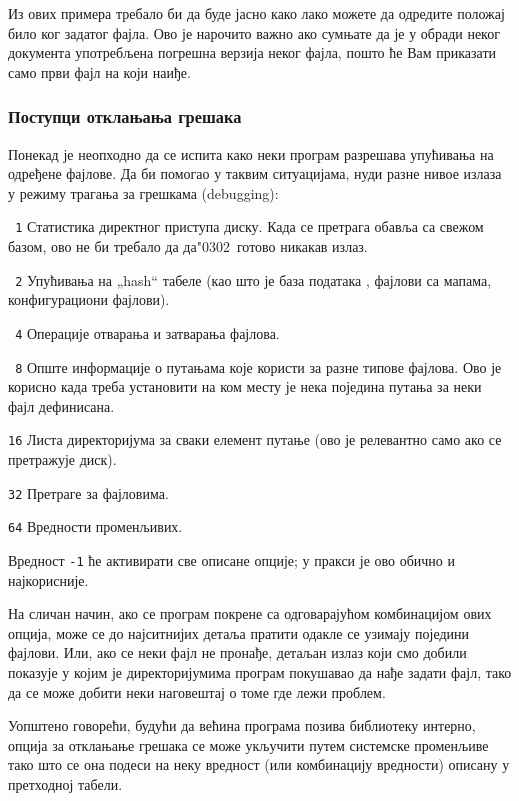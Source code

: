 \documentclass{article}
\begin{document}
Из ових примера требало би да буде јасно како лако можете да одредите
положај било ког задатог фајла. Ово је нарочито важно ако сумњате да
је у обради неког документа употребљена погрешна верзија неког фајла,
пошто ће Вам  приказати само први фајл на који наиђе.

\subsubsection{Поступци отклањања грешака}
\label{sec:debugging}

Понекад је неопходно да се испита како неки програм разрешава
упућивања на одређене фајлове. Да би помогао у таквим ситуацијама,
\KPS{} нуди разне нивое излаза у режиму трагања за грешкама
(\textenglish{debugging}):
\begin{ttdescription}
\item[\texttt{\ 1}] Статистика директног приступа диску. Када се
  претрага обавља са свежом  базом, ово не би требало да
  да\char"0302\ готово никакав излаз.
\item[\texttt{\ 2}] Упућивања на „hash“ табеле (као што је база
  података , фајлови са мапама, конфигурациони фајлови).
\item[\texttt{\ 4}] Операције отварања и затварања фајлова.
\item[\texttt{\ 8}] Опште информације о путањама које \KPS{} користи
  за разне типове фајлова. Ово је корисно када треба установити на
  ком месту   је нека поједина путања за неки фајл дефинисана.
\item[\texttt{16}] Листа директоријума за сваки елемент путање (ово
  је релевантно само ако се претражује диск).
\item[\texttt{32}] Претраге за фајловима.
\item[\texttt{64}] Вредности променљивих.
\end{ttdescription}
Вредност \texttt{-1} ће активирати све описане опције; у пракси је ово
обично и најкорисније.

На сличан начин, ако се програм  покрене са
одговарајућом комбинацијом ових опција, може се до најситнијих детаља
пратити одакле се узимају поједини фајлови. Или, ако се неки фајл не
пронађе, детаљан излаз који смо добили показује у којим је
директоријумима програм покушавао да нађе задати фајл, тако да се
може добити неки наговештај о томе где лежи проблем.

Уопштено говорећи, будући да већина програма позива библиотеку \KPS{}
интерно, опција за отклањање грешака се може укључити путем системске
променљиве  тако што се она подеси на неку
вредност (или комбинацију вредности) описану у претходној табели.
\end{document}
